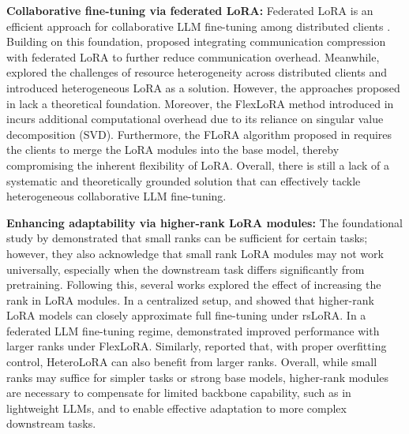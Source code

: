 \documentclass{article} %
\theoremstyle{plain}
\theoremstyle{definition}
\begin{document}
\textbf{Collaborative fine-tuning via federated LoRA:} Federated LoRA is an efficient approach for collaborative LLM fine-tuning among distributed clients \citep{chen2023federated,sun2024improving,guo2025selectiveaggregationlowrankadaptation}. Building on this foundation, \citet{kuo2024federatedlorasparsecommunication} proposed integrating communication compression with federated LoRA to further reduce communication overhead. Meanwhile, \citet{bai2024federatedfinetuninglargelanguage,cho2024heterogeneouslorafederatedfinetuning,byun2024towards,wang2024flora,koo2024robustefficientfederatedlowrank} explored the challenges of resource heterogeneity across distributed clients and introduced heterogeneous LoRA as a solution.
However, the approaches proposed in \citep{cho2024heterogeneouslorafederatedfinetuning,koo2024robustefficientfederatedlowrank,byun2024towards,bai2024federatedfinetuninglargelanguage} lack a theoretical foundation. Moreover, the FlexLoRA method introduced in \citep{bai2024federatedfinetuninglargelanguage} incurs additional computational overhead due to its reliance on singular value decomposition (SVD). Furthermore, the FLoRA algorithm proposed in \citep{wang2024flora} requires the clients to merge the LoRA modules into the base model, thereby compromising the inherent flexibility of LoRA. Overall, there is still a lack of a systematic and theoretically grounded solution that can effectively tackle heterogeneous collaborative LLM fine-tuning.

\textbf{Enhancing adaptability via higher-rank LoRA modules:}
The foundational study by \citet{hu2021lora} demonstrated that small ranks can be sufficient for certain tasks; however, they also acknowledge that small rank LoRA modules may not work universally, especially when the downstream task differs significantly from pretraining. Following this, several works explored the effect of increasing the rank in LoRA modules. In a centralized setup, \citet{kalajdzievski2023rankstabilizationscalingfactor} and  \citet{shuttleworth2024lora} showed that higher-rank LoRA models can closely approximate full fine-tuning under rsLoRA. In a federated LLM fine-tuning regime, \citet{bai2024federatedfinetuninglargelanguage} demonstrated improved performance with larger ranks under FlexLoRA. 
Similarly, \citet{cho2024heterogeneouslorafederatedfinetuning} reported that, with proper overfitting control, HeteroLoRA can also benefit from larger ranks.
Overall, while small ranks may suffice for simpler tasks or strong base models, higher-rank modules are necessary to compensate for limited backbone capability, such as in lightweight LLMs, and to enable effective adaptation to more complex downstream tasks.
\end{document}
